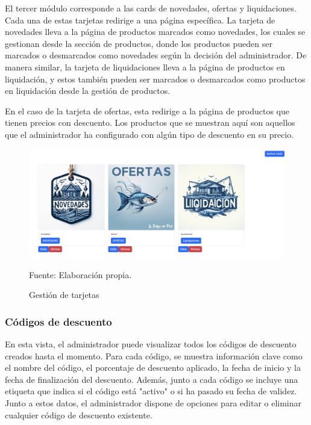 El tercer módulo corresponde a las cards de novedades, ofertas y liquidaciones. Cada una de estas tarjetas redirige a una página específica. La tarjeta de novedades lleva a la página de productos marcados como novedades, los cuales se gestionan desde la sección de productos, donde los productos pueden ser marcados o desmarcados como novedades según la decisión del administrador. De manera similar, la tarjeta de liquidaciones lleva a la página de productos en liquidación, y estos también pueden ser marcados o desmarcados como productos en liquidación desde la gestión de productos.

\vspace{0.5cm}

En el caso de la tarjeta de ofertas, esta redirige a la página de productos que tienen precios con descuento. Los productos que se muestran aquí son aquellos que el administrador ha configurado con algún tipo de descuento en su precio.

\begin{figure}[H]
\begin{center}
\includegraphics[scale=0.35]{./Images/vistaAdminCards.png}
\caption{Gestión de tarjetas} Fuente: Elaboración propia.

\label{fig:fig1}

\end{center}
\end{figure}

\subsubsection{Códigos de descuento}\label{subsec5.1.2.4}
En esta vista, el administrador puede visualizar todos los códigos de descuento creados hasta el momento. Para cada código, se muestra información clave como el nombre del código, el porcentaje de descuento aplicado, la fecha de inicio y la fecha de finalización del descuento. Además, junto a cada código se incluye una etiqueta que indica si el código está "activo" o si ha pasado su fecha de validez. Junto a estos datos, el administrador dispone de opciones para editar o eliminar cualquier código de descuento existente.

